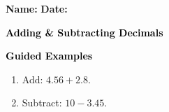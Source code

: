 \documentclass[12pt, letterpaper, fleqn]{article}
\begin{document}
\textbf{Name:} \underline{\hspace{5cm}}
\hfill
\textbf{Date:} \underline{\hspace{3cm}}\\

\begin{tcolorbox}[colback=customteal!20]
    \large\textcolor{black}{\textbf{Adding \& Subtracting Decimals}}
\end{tcolorbox}
\newpage
\begin{tcolorbox}[colback=customteal!20]
    \large\textcolor{black}{\textbf{Guided Examples}}
\end{tcolorbox}
\begin{enumerate}[itemsep=3.5cm, leftmargin=0.6cm]
\item Add: $4.56 + 2.8$.
\vspace{3cm}
\item Subtract: $10 - 3.45$.
\end{enumerate}
\end{document}
